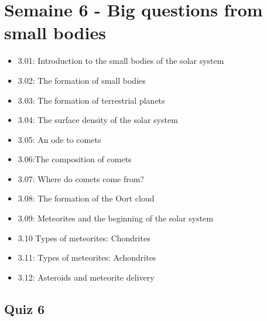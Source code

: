 \section*{Semaine 6 - Big questions from small bodies}


\begin{itemize}[label={$\bullet$}]
    \item 3.01: Introduction to the small bodies of the solar system
    \item 3.02: The formation of small bodies
    \item 3.03: The formation of terrestrial planets
    \item 3.04: The surface density of the solar system
    \item 3.05: An ode to comets
    \item 3.06:The composition of comets
    \item 3.07: Where do comets come from?
    \item 3.08: The formation of the Oort cloud
    \item 3.09: Meteorites and the beginning of the solar system
    \item 3.10 Types of meteorites: Chondrites
    \item 3.11: Types of meteorites: Achondrites
    \item 3.12: Asteroids and meteorite delivery
\end{itemize}

\newpage 

\subsection*{Quiz 6}

